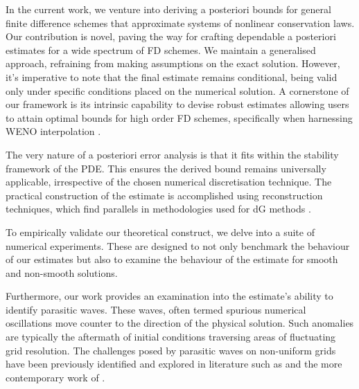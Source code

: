 \documentclass[final]{amsart}
\numberwithin{equation}{section}
\begin{document}
In the current work, we venture into deriving a posteriori bounds for
general finite difference schemes that approximate systems of
nonlinear conservation laws. Our contribution is novel, paving the way
for crafting dependable a posteriori estimates for a wide spectrum of
FD schemes. We maintain a generalised approach, refraining from making
assumptions on the exact solution. However, it's imperative to note
that the final estimate remains conditional, being valid only under
specific conditions placed on the numerical solution. A cornerstone of
our framework is its intrinsic capability to devise robust estimates
allowing users to attain optimal bounds for high order FD schemes,
specifically when harnessing WENO interpolation
\cite{liu2009positivity,janett2019novel}.

The very nature of a posteriori error analysis is that it fits within
the stability framework of the PDE. This ensures the derived bound
remains universally applicable, irrespective of the chosen numerical
discretisation technique. The practical construction of the estimate
is accomplished using reconstruction techniques, which find parallels
in methodologies used for dG methods
\cite{makridakis2007space,giesselmann2015posteriori,giesselmann2017posteriori,dedner2019residual}.

To empirically validate our theoretical construct, we delve into a
suite of numerical experiments. These are designed to not only
benchmark the behaviour of our estimates but also to examine the
behaviour of the estimate for smooth and non-smooth solutions.

Furthermore, our work provides an examination into the estimate's
ability to identify parasitic waves. These waves, often termed
spurious numerical oscillations move counter to the direction of the
physical solution. Such anomalies are typically the aftermath of
initial conditions traversing areas of fluctuating grid
resolution. The challenges posed by parasitic waves on non-uniform
grids have been previously identified and explored in literature such
as \cite{vichnevetsky1981energy, vichnevetsky1981propagation,
  trefethen1982group} and the more contemporary work of
\cite{long2011numerical}.
\end{document}
